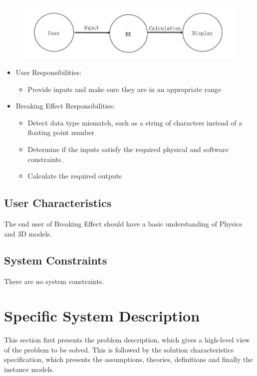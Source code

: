 \documentclass[12pt]{article}
\newcommand{\progname}{Breaking Effect} %
\begin{document}
\begin{figure}
	\centering
	\includegraphics[width=0.7\linewidth]{./f18}
	\caption{}
	\label{fig:f18}
\end{figure}

\begin{itemize}
\item User Responsibilities:
\begin{itemize}
\item Provide inputs and make sure they are in an appropriate range
\end{itemize}
\item \progname{} Responsibilities:
\begin{itemize}
\item Detect data type mismatch, such as a string of characters instead of a
  floating point number
\item Determine if the inputs satisfy the required physical and software constraints.​
\item Calculate the required outputs
\end{itemize}
\end{itemize}

\subsection{User Characteristics} \label{SecUserCharacteristics}

The end user of \progname{} should have a basic understanding of Physics and 3D models.

\subsection{System Constraints}

There are no system constraints.

\section{Specific System Description}

This section first presents the problem description, which gives a high-level
view of the problem to be solved.  This is followed by the solution characteristics
specification, which presents the assumptions, theories, definitions and finally
the instance models. 
\end{document}
